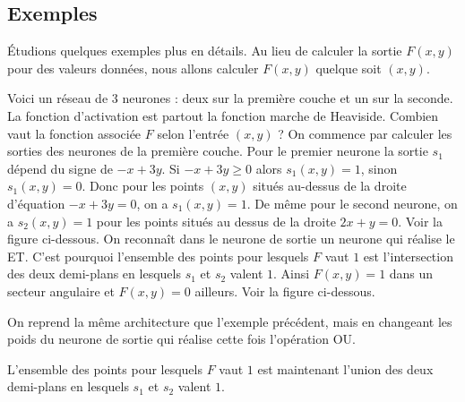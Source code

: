 \documentclass[11pt,class=report,crop=false]{standalone}
\begin{document}
\subsection{Exemples}

\'Etudions quelques exemples plus en détails. Au lieu de calculer la sortie $F(x,y)$ pour des valeurs données, nous allons calculer $F(x,y)$ quelque soit $(x,y)$.

\vspace*{-1.5ex}

\begin{exemple}
Voici un réseau de $3$ neurones : deux sur la première couche et un sur la seconde. La fonction d'activation est partout la fonction marche de Heaviside.
Combien vaut la fonction associée $F$ selon l'entrée $(x,y)$ ?
On commence par calculer les sorties des neurones de la première couche.
Pour le premier neurone la sortie $s_1$ dépend du signe de $-x+3y$.
Si $-x+3y \ge 0$ alors $s_1(x,y)=1$, sinon $s_1(x,y)=0$. Donc pour les points $(x,y)$ situés au-dessus de la droite d'équation $-x+3y=0$, on a $s_1(x,y)=1$.
De même pour le second neurone, on a $s_2(x,y)=1$ pour les points situés au dessus de la droite $2x+y=0$. Voir la figure ci-dessous.
On reconnaît dans le neurone de sortie un neurone qui réalise le \og{}ET\fg{}. 
C'est pourquoi l'ensemble des points pour lesquels $F$ vaut $1$ est l'intersection des deux demi-plans en lesquels $s_1$ et $s_2$ valent $1$. Ainsi $F(x,y)=1$ dans un secteur angulaire et $F(x,y)=0$ ailleurs. Voir la figure ci-dessous.


\end{exemple}

\medskip

\begin{exemple}
On reprend la même architecture que l'exemple précédent, mais en changeant les poids du neurone de sortie qui réalise cette fois l'opération \og{}OU\fg{}.


L'ensemble des points pour lesquels $F$ vaut $1$ est maintenant l'union des deux demi-plans en lesquels $s_1$ et $s_2$ valent $1$.

\end{exemple}
\end{document}
